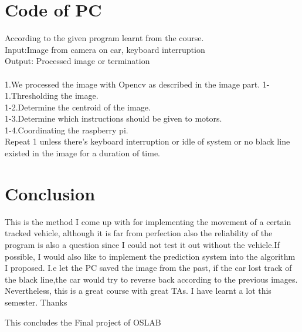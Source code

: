 \documentclass[12pt]{article}
\begin{document}
\section{Code of PC} 
According to the given program learnt from the course.\\
Input:Image from camera on car, keyboard interruption\\
Output: Processed image or termination\\\\
1.We processed the image with Opencv as described in the image part.
1-1.Thresholding the image.\\
1-2.Determine the centroid of the image.\\
1-3.Determine which instructions should be given to motors.\\
1-4.Coordinating the raspberry pi.\\
Repeat 1 unless there's keyboard interruption or idle of system or no black line existed in the image for a duration of time.

\cleardoublepage
\section{Conclusion}
This is the method I come up with for implementing the movement of a certain tracked vehicle, although it is far from perfection also the reliability of the program is also a question since I could not test it out without the vehicle.If possible, I would also like to implement the prediction system into the algorithm I proposed. I.e let the PC saved the image from the past, if the car lost track of the black line,the car would try to reverse back according to the previous images. Nevertheless, this is a great course with great TAs. I have learnt a lot this semester. Thanks~

\begin{center} 
This concludes the Final project of OSLAB\\
\end{center}
\end{document}

